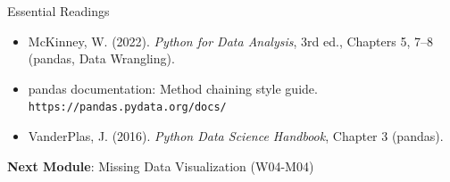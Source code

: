 \documentclass[10pt]{beamer}
\begin{document}
\begin{frame}{Essential Readings}
  \begin{itemize}
    \item McKinney, W. (2022). \emph{Python for Data Analysis}, 3rd ed.,
          Chapters 5, 7--8 (pandas, Data Wrangling).
    \item pandas documentation: Method chaining style guide.
          \texttt{https://pandas.pydata.org/docs/}
    \item VanderPlas, J. (2016). \emph{Python Data Science Handbook},
          Chapter 3 (pandas).
  \end{itemize}
  \vspace{6pt}
  \textbf{Next Module}: Missing Data Visualization (W04-M04)
\end{frame}
\end{document}
